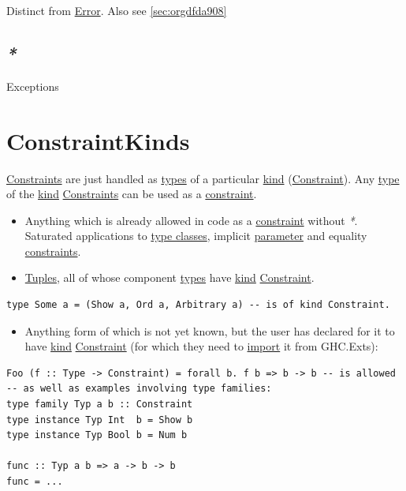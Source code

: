 \documentclass[a4paper,14pt,oneside]{book}
\begin{document}
Distinct from \hyperref[orge2ee17f]{Error}. Also see \ref{sec:orgdfda908}

\section{\emph{*}}
\label{sec:org46feb7e}

\label{orgb655563}Exceptions

\chapter{\label{orgba5dea2}ConstraintKinds}
\label{sec:orga8e0783}
\hyperref[orgb98d137]{Constraints} are just handled as \hyperref[org3bcae61]{types} of a particular \hyperref[org03362ec]{kind} (\hyperref[orgeb04465]{Constraint}).
Any \hyperref[orga64e483]{type} of the \hyperref[org03362ec]{kind} \hyperref[orgb98d137]{Constraints} can be used as a \hyperref[orgeb04465]{constraint}.
\begin{itemize}
\item Anything which is already allowed in code as a \hyperref[orgeb04465]{constraint} without \emph{*}. Saturated applications to \hyperref[org160f80b]{type classes}, implicit \hyperref[org9e351ce]{parameter} and equality \hyperref[orgb98d137]{constraints}.
\item \hyperref[orgb913a49]{Tuples}, all of whose component \hyperref[org3bcae61]{types} have \hyperref[org03362ec]{kind} \hyperref[orgeb04465]{Constraint}.
\end{itemize}
\begin{verbatim}
type Some a = (Show a, Ord a, Arbitrary a) -- is of kind Constraint.
\end{verbatim}
\begin{itemize}
\item Anything form of which is not yet known, but the user has declared for it to have \hyperref[org03362ec]{kind} \hyperref[orgeb04465]{Constraint} (for which they need to \hyperref[org99640d2]{import} it from GHC.Exts):
\end{itemize}
\begin{verbatim}
Foo (f :: Type -> Constraint) = forall b. f b => b -> b -- is allowed
-- as well as examples involving type families:
type family Typ a b :: Constraint
type instance Typ Int  b = Show b
type instance Typ Bool b = Num b

func :: Typ a b => a -> b -> b
func = ...
\end{verbatim}
\end{document}
